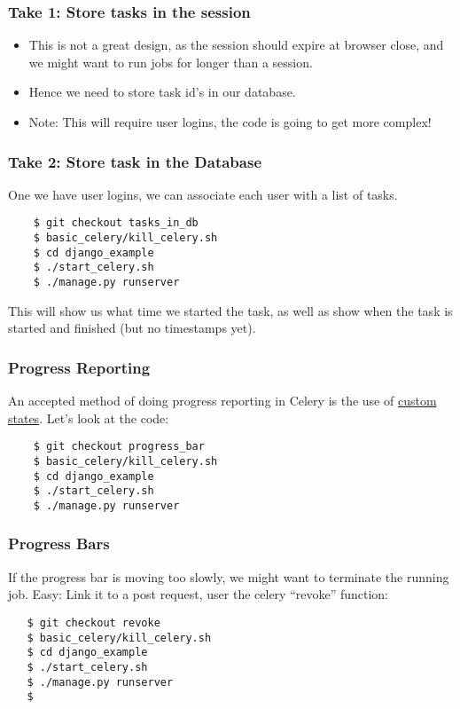 \documentclass[9pt]{beamer}
\begin{document}
\begin{frame}[fragile]
  \frametitle{Take 1: Store tasks in the session}
  \begin{itemize}
  \item This is not a great design, as the session should expire at browser close, and we might want to run jobs for longer than a session.
    \pause
  \item Hence we need to store task id's in our database.
    \pause
  \item Note: This will require user logins, the code is going to get more complex!
  \end{itemize}
\end{frame}

\begin{frame}[fragile]
  \frametitle{Take 2: Store task in the Database}
  One we have user logins, we can associate each user with a list of tasks.
  \begin{verbatim}
    $ git checkout tasks_in_db
    $ basic_celery/kill_celery.sh
    $ cd django_example
    $ ./start_celery.sh
    $ ./manage.py runserver
  \end{verbatim}
  This will show us what time we started the task, as well as show when the task is started and finished (but no timestamps yet).
\end{frame}

\begin{frame}[fragile]
  \frametitle{Progress Reporting}
  An accepted method of doing progress reporting in Celery is the use of \href{http://docs.celeryproject.org/en/latest/userguide/tasks.html#custom-states}{custom states}. Let's look at the code:
  \begin{verbatim}
    $ git checkout progress_bar
    $ basic_celery/kill_celery.sh
    $ cd django_example
    $ ./start_celery.sh
    $ ./manage.py runserver
  \end{verbatim}
\end{frame}

\begin{frame}[fragile]
  \frametitle{Progress Bars}
  If the progress bar is moving too slowly, we might want to terminate the running job. Easy: Link it to a post request, user the celery ``revoke'' function:
  \begin{verbatim}
   $ git checkout revoke
   $ basic_celery/kill_celery.sh
   $ cd django_example
   $ ./start_celery.sh
   $ ./manage.py runserver
   $
  \end{verbatim}  
\end{frame}
\end{document}

